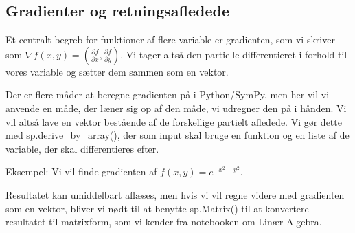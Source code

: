 \documentclass[letterpaper,10pt,english]{jupyterBook}
\begin{document}
\noindent{}

\noindent{}

\noindent{}

\noindent{}


\subsection{Gradienter og retningsafledede}
\label{\detokenize{notebooks/sympy/Notebook_FlereVar_analyse:gradienter-og-retningsafledede}}
Et centralt begreb for funktioner af flere variable er gradienten, som vi skriver som \(\nabla f(x,y) = \left(\frac{\partial f}{\partial x}, \frac{\partial f}{\partial y}\right)\). Vi tager altså den partielle differentieret i forhold til vores variable og sætter dem sammen som en vektor.

Der er flere måder at beregne gradienten på i Python/SymPy, men her vil vi anvende en måde, der læner sig op af den måde, vi udregner den på i hånden. Vi vil altså lave en vektor bestående af de forskellige partielt afledede. Vi gør dette med sp.derive\_by\_array(), der som input skal bruge en funktion og en liste af de variable, der skal differentieres efter.

Eksempel: Vi vil finde gradienten af \(f(x,y) = e^{- x^2 - y^2}\).

\begin{sphinxVerbatim}[commandchars=\\\{\}]
         

   \PYG{p}{[} \PYG{p}{]}
\end{sphinxVerbatim}

\noindent{}

Resultatet kan umiddelbart aflæses, men hvis vi vil regne videre med gradienten som en vektor, bliver vi nødt til at benytte sp.Matrix() til at konvertere resultatet til matrixform, som vi kender fra notebooken om Linær Algebra.
\end{document}
